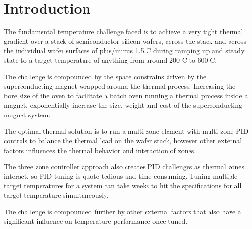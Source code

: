   \section{Introduction}
    The fundamental temperature challenge faced is to achieve a very tight thermal
    gradient over a stack of semiconductor silicon wafers, across the stack and 
    across the individual wafer surfaces of plus/minus 1.5 \degree C during ramping 
    up and steady state to a target temperature of anything from around 200 \degree 
    C to 600 \degree C.

    The challenge is compounded by the space constrains driven by the superconducting 
    magnet wrapped around the thermal process. Increasing the bore size of the oven 
    to facilitate a batch oven running a thermal process inside a magnet, exponentially 
    increase the size, weight and cost of the superconducting magnet system.
  
    The optimal thermal solution is to run a multi-zone element with multi zone PID 
    controls to balance the thermal load on the wafer stack, however other external 
    factors inﬂuences the thermal behavior and interaction of zones.
  
    The three zone controller approach also creates PID challenges as thermal zones 
    interact, so PID tuning is quote tedious and time consuming. Tuning multiple 
    target temperatures for a system can take weeks to hit the speciﬁcations for all 
    target temperature simultaneously.
  
    The challenge is compounded further by other external factors that also have a 
    signiﬁcant inﬂuence on temperature performance once tuned.


